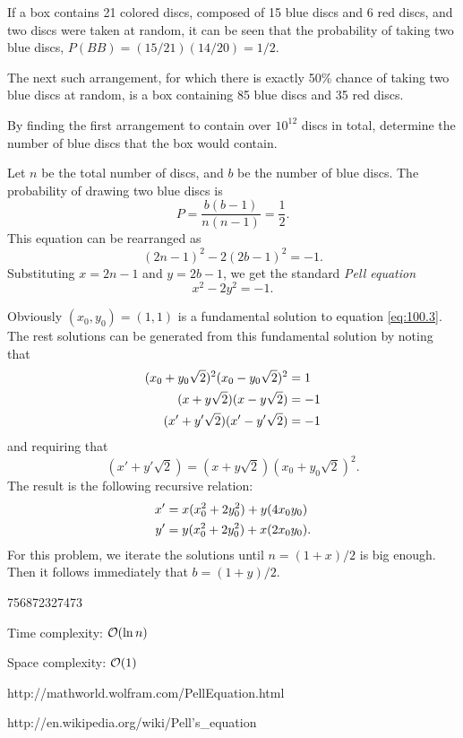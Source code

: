 




If a box contains 21 colored discs, composed of 15 blue discs and 6 red discs, and two discs were taken at random, it can be seen that the probability of taking two blue discs, $P(BB) = (15/21)(14/20) = 1/2$.

The next such arrangement, for which there is exactly 50\% chance of taking two blue discs at random, is a box containing 85 blue discs and 35 red discs.

By finding the first arrangement to contain over $10^{12}$ discs in total, determine the number of blue discs that the box would contain.

\solution

Let $n$ be the total number of discs, and $b$ be the number of blue discs. The probability of drawing two blue discs is
\begin{equation}
P = \frac{b(b-1)}{n(n-1)} = \frac12 . \label{eq:100.1}
\end{equation}
This equation can be rearranged as
\begin{equation}
(2n-1)^2 - 2(2b-1)^2 = -1 . \label{eq:100.2}
\end{equation}
Substituting $x=2n-1$ and $y=2b-1$, we get the standard \emph{Pell equation}
\begin{equation}
x^2 - 2 y^2 = -1 . \label{eq:100.3}
\end{equation}

Obviously $(x_0,y_0) = (1,1)$ is a fundamental solution to equation \eqref{eq:100.3}. The rest solutions can be generated from this fundamental solution by noting that
\begin{align}
(x_0 + y_0 \sqrt{2})^2(x_0 - y_0 \sqrt{2})^2 &= 1 \notag \\
(x + y \sqrt{2})(x - y \sqrt{2}) &= -1 \notag \\
(x' + y' \sqrt{2})(x' - y' \sqrt{2}) &= -1 \notag
\end{align}
and requiring that
\[
(x' + y' \sqrt{2}) = (x + y \sqrt{2}) (x_0 + y_0 \sqrt{2})^2 .
\]
The result is the following recursive relation:
\begin{align}
x' &= x(x_0^2+2 y_0^2) + y (4 x_0 y_0) \notag \\
y' &= y(x_0^2+2 y_0^2) + x (2 x_0 y_0) \notag .
\end{align}
For this problem, we iterate the solutions until $n = (1+x)/2$ is big enough. Then it follows immediately that $b = (1+y)/2$.

\answer

756872327473

\complexity

Time complexity: $\mathcal{O}(\ln n)$

Space complexity: $\mathcal{O}(1)$


http://mathworld.wolfram.com/PellEquation.html

http://en.wikipedia.org/wiki/Pell's\_equation


